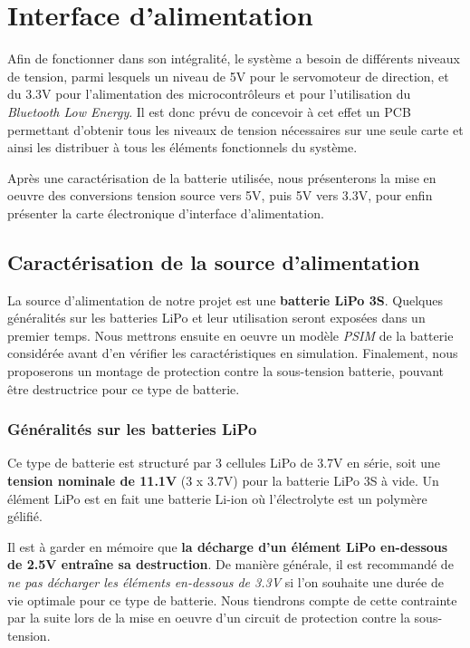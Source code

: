 \chapter{Interface d'alimentation}
		
Afin de fonctionner dans son intégralité, le système a besoin de 
différents niveaux de tension, parmi lesquels un niveau de 5V pour 
le servomoteur de direction, et du 3.3V pour l'alimentation des 
microcontrôleurs et pour l'utilisation du 
\textit{Bluetooth Low Energy}. 
Il est donc prévu de concevoir à cet effet un PCB permettant 
d'obtenir tous les niveaux de tension nécessaires sur une seule 
carte et ainsi les distribuer à tous les éléments fonctionnels du 
système. 
	
Après une caractérisation de la batterie utilisée, nous présenterons 
la mise en oeuvre des conversions tension source vers 5V, puis 5V 
vers 3.3V, pour enfin présenter la carte électronique d'interface	 
d'alimentation.
		
	\section{Caractérisation de la source d'alimentation}
			
	La source d'alimentation de notre projet est une 
	\textbf{batterie LiPo 3S}. Quelques généralités sur les batteries 
	LiPo et leur utilisation seront exposées dans un premier temps. 
	Nous mettrons ensuite en oeuvre un modèle \textit{PSIM} de la batterie
	considérée avant d'en vérifier les caractéristiques en simulation. 
	Finalement, nous proposerons un montage de protection contre la 
	sous-tension batterie, pouvant être destructrice pour ce type de 
	batterie.
		
		\subsection{Généralités sur les batteries LiPo}
			
		Ce type de batterie est structuré par 3 cellules LiPo de 3.7V en 
		série, soit une \textbf{tension nominale de 11.1V} (3 x 3.7V) pour 
		la batterie LiPo 3S à vide. Un élément LiPo est en fait une batterie 
		Li-ion où l'électrolyte est un polymère gélifié.
			
		Il est à garder en mémoire que \textbf{la décharge d'un élément LiPo 
		en-dessous de 2.5V entraîne sa destruction}. De manière générale, il 
		est recommandé de 
		\textit{ne pas décharger les éléments en-dessous de 3.3V} 
		si l'on souhaite une durée de vie optimale pour ce type de batterie.
		Nous tiendrons compte de cette contrainte par la suite lors de la
		mise en oeuvre d'un circuit de protection contre la sous-tension. 
			
